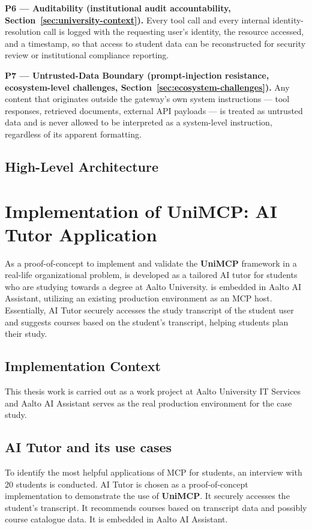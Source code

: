 \documentclass[english, 12pt, a4paper, elec, utf8, a-2b, online]{aaltothesis}
\newcommand{\UniMCP}{\textbf{UniMCP}\xspace}
\newcommand{\aitutor}{\text{AI Tutor}\xspace}
\begin{document}
\textbf{P6 --- Auditability (institutional audit accountability, Section~\ref{sec:university-context}).}
Every tool call and every internal identity-resolution call is logged with the requesting user's
identity, the resource accessed, and a timestamp, so that access to student data can be reconstructed
for security review or institutional compliance reporting.
 
\textbf{P7 --- Untrusted-Data Boundary (prompt-injection resistance, ecosystem-level challenges,
Section~\ref{sec:ecosystem-challenges}).}
Any content that originates outside the gateway's own system instructions --- tool responses,
retrieved documents, external API payloads --- is treated as untrusted data and is never allowed to
be interpreted as a system-level instruction, regardless of its apparent formatting.


\subsection{High-Level Architecture}
 

\clearpage
\section{Implementation of \UniMCP: AI Tutor Application}
\label{chap:implementation}

As a proof-of-concept to implement and validate the \UniMCP framework in a real-life organizational problem, \aitutor is developed as a tailored AI tutor for students who are studying towards a degree at Aalto University.
\aitutor is embedded in Aalto AI Assistant, utilizing an existing production environment as an MCP host.
Essentially, AI Tutor securely accesses the study transcript of the student user and suggests courses based on the student's transcript, helping students plan their study.

\subsection{Implementation Context}
This thesis work is carried out as a work project at Aalto University IT Services and Aalto AI Assistant serves as the real production environment for the case study.

\subsection{AI Tutor and its use cases} 
To identify the most helpful applications of MCP for students, an interview with 20 students is conducted. 
AI Tutor is chosen as a proof-of-concept implementation to demonstrate the use of \UniMCP. 
It securely accesses the student’s transcript.
It recommends courses based on transcript data and possibly course catalogue data.
It is embedded in Aalto AI Assistant.
\end{document}
